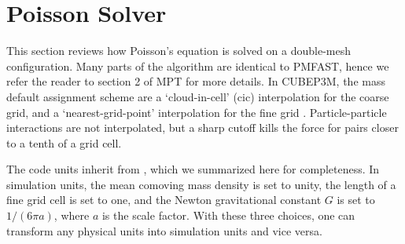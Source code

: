 \section{Poisson Solver}
\label{sec:Poisson}


This section reviews how Poisson's equation is solved on a double-mesh configuration. 
Many parts of the algorithm are identical to {\small PMFAST}, hence we refer the reader 
to section 2 of MPT for more details. In {\small CUBEP3M}, the mass default assignment scheme are
a `cloud-in-cell' (cic) interpolation for the coarse grid,  and a `nearest-grid-point' interpolation 
for the fine grid \citep{1981csup.book.....H}. Particle-particle interactions are not interpolated, but a sharp cutoff kills the force
for pairs closer to a tenth of a grid cell. 

The code units inherit from \citep{2004NewA....9..443T}, which we summarized here for completeness.
In simulation units, the mean comoving mass density is set to unity, the length of a fine grid cell is set to one,
and the Newton gravitational  constant $G$ is set to $1/(6 \pi a)$, where $a$ is the scale factor.
With these three choices, one can transform any physical units into simulation units and vice versa.



